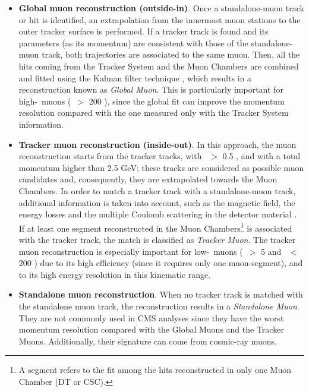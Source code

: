 \begin{itemize}
 \item \textbf{Global muon reconstruction (outside-in)}. Once a standalone-muon 
 track or hit is identified,  an extrapolation from the innermost muon stations to 
 the outer tracker surface is performed. If a tracker track is found and its 
 parameters (as its momentum) are consistent with those of the standalone-muon track, both trajectories
 are associated to the same muon. Then, all the hits coming from the Tracker System
 and the Muon Chambers are combined and fitted using the Kalman 
 filter technique \cite{KalmanAlgorithm}, which results in a reconstruction known as \textit{Global Muon}.
 This is particularly important for high-\pt~muons (\pt~$>$ 200 \GeV), since 
 the global fit can improve the momentum resolution compared with the one measured only with the 
 Tracker System information. 
 \item \textbf{Tracker muon reconstruction (inside-out)}. In this approach, the muon reconstruction 
 starts from the tracker tracks, with \pt~$>$ 0.5 \GeV, and 
 with a total momentum higher than 2.5 GeV; these tracks are considered as 
 possible muon candidates and, consequently, they are extrapolated towards 
 the Muon Chambers. In order to match a tracker track with a standalone-muon 
 track, additional information is taken into account, such as the magnetic field,
 the energy losses and the multiple Coulomb scattering in the 
 detector material \cite{MuonID7TeV}. If at least one segment reconstructed in the Muon Chambers\footnote{
 A segment refers to the fit among the hits reconstructed in only one Muon Chamber (DT or CSC).} 
 is associated with the tracker track, the match is 
 classified as \textit{Tracker Muon}. The tracker muon reconstruction is especially
 important for low-\pt~muons (\pt~$>$ 5 \GeV and \pt~$<$ 200 \GeV) due 
 to its high efficiency (since it requires only one muon-segment), 
 and to its high energy resolution in this kinematic range. 
 \item \textbf{Standalone muon reconstruction}. When no tracker track is matched with the standalone muon track,
 the reconstruction results in a \textit{Standalone Muon}. They are not commonly used in CMS analyses since they 
 have the worst momentum resolution compared with the Global Muons and the Tracker Muons. Additionally, their 
 signature can come from cosmic-ray muons.
\end{itemize}

